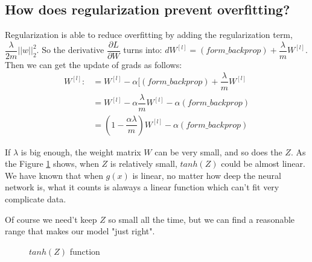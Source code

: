 \documentclass{article}
\begin{document}
\subsection{How does regularization prevent overfitting?}
\indent Regularization is able to reduce overfitting by adding the regularization term, $\dfrac{\lambda}{2m}||w||_{2}^{2}$. So the derivative $\dfrac{\partial L}{\partial W}$ turns into: $dW^{[l]}=(form\_backprop)+\dfrac{\lambda}{m}W^{[l]}$. Then we can get the update of grads as follows:
\begin{align}
W^{[l]}:&=W^{[l]}-\alpha [ (form\_backprop)+\dfrac{\lambda}{m}W^{[l]}\\
&=W^{[l]}-\alpha\dfrac{\lambda}{m}W^{[l]}-\alpha(form\_backprop)\\
&=(1-\dfrac{\alpha\lambda}{m})W^{[l]}-\alpha(form\_backprop)
\end{align} 

\indent If $\lambda$ is big enough, the weight matrix $W$ can be very small, and so does the $Z$. As the Figure \ref{tanh} shows, when $Z$ is relatively small, $tanh(Z)$ could be almost linear. We have known that when $g(x)$ is linear, no matter how deep the neural network is, what it counts is alaways a linear function which can't fit very complicate data.

\indent Of course we need't keep $Z$ so small all the time, but we can find a reasonable range that makes our model "just right".

\par
\begin{figure}[htbp]
\caption{$tanh(Z)$ function}
\label{tanh}%
\end{figure}
\end{document}
